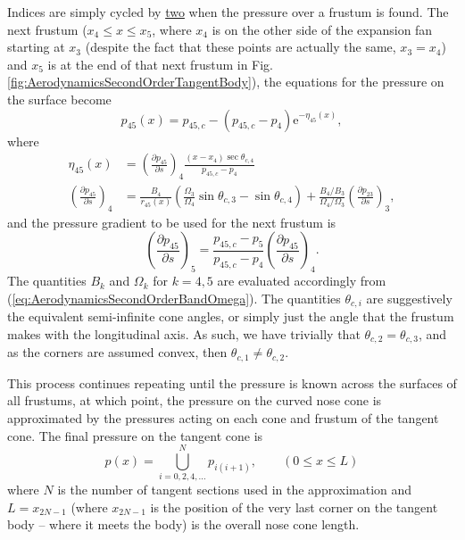 \documentclass[11pt,dvipsnames]{thesis}
\begin{document}
Indices are simply cycled by \underline{two} when the pressure over a frustum is found. The next frustum ($x_4 \leqslant x \leqslant x_5$, where $x_4$ is on the other side of the expansion fan starting at $x_3$ (despite the fact that these points are actually the same, $x_3 = x_4$) and $x_5$ is at the end of that next frustum in Fig. \ref{fig:AerodynamicsSecondOrderTangentBody}), the equations for the pressure on the surface become
\begin{equation}
p_{45}(x) = p_{45,c} - (p_{45,c} - p_4) \mathrm{e}^{-\eta_{45}(x)},
\end{equation}
where 
\begin{align}
\eta_{45}(x) &= \left(\frac{\partial p_{45}}{\partial s}\right)_{\!4} \frac{(x - x_4) \sec\theta_{c,4}}{p_{45,c} - p_4} \\
\left(\frac{\partial p_{45}}{\partial s}\right)_{\!4} &= \frac{B_4}{r_{45}(x)}\left(\frac{\Omega_3}{\Omega_4} \sin\theta_{c,3} - \sin\theta_{c,4}\right) + \frac{B_4/B_3}{\Omega_4 / \Omega_3} \left(\frac{\partial p_{23}}{\partial s}\right)_{\!3},
\end{align}
and the pressure gradient to be used for the next frustum is
\begin{equation}
\left(\frac{\partial p_{45}}{\partial s}\right)_{\!5} = \frac{p_{45,c} - p_5}{p_{45,c} - p_4} \left(\frac{\partial p_{45}}{\partial s}\right)_{\!4}.
\end{equation}
The quantities $B_k$ and $\Omega_k$ for $k = 4,5$ are evaluated accordingly from (\ref{eq:AerodynamicsSecondOrderBandOmega}). 
The quantities $\theta_{c,i}$ are suggestively the equivalent semi-infinite cone angles, or simply just the angle that the frustum makes with the longitudinal axis. As such, we have trivially that $\theta_{c,2} = \theta_{c,3}$, and as the corners are assumed convex, then $\theta_{c,1} \neq \theta_{c,2}$.

This process continues repeating until the pressure is known across the surfaces of all frustums, at which point, the pressure on the curved nose cone is approximated by the pressures acting on each cone and frustum of the tangent cone.
The final pressure on the tangent cone is 
\begin{equation}
p(x) = \bigcup_{i=0,2,4,\ldots}^N p_{i(i+1)}, \qquad (0 \leqslant x \leqslant L)
\end{equation}
where $N$ is the number of tangent sections used in the approximation and $L = x_{2N - 1}$ (where $x_{2N - 1}$ is the position of the very last corner on the tangent body -- where it meets the body) is the overall nose cone length.
\end{document}
